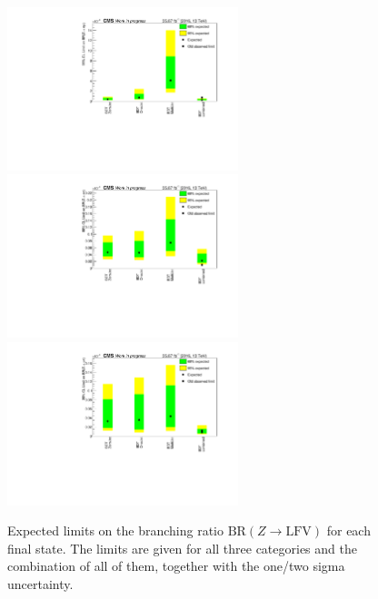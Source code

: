 \begin{figure}[htp]
	\centering
	\includegraphics[width=0.6\textwidth]{plots/em/limits.pdf}
	\includegraphics[width=0.6\textwidth]{plots/et/limits.pdf}
	\includegraphics[width=0.6\textwidth]{plots/mt/limits.pdf}

	\caption[Expected limits on the branching ratios]{Expected limits on the branching ratio $\text{BR}(Z\to\text{LFV})$ for each final state. The limits are given for all three categories and the combination of all of them, together with the one/two sigma uncertainty.}
	\label{fig:fig_5_1}
\end{figure}
















